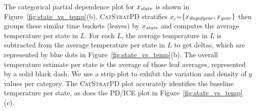 \documentclass[12pt]{article}
\newcommand{\figref}[1]{Figure~\ref{#1}}
\newcommand{\cut}[1]{}
\newcommand{\cspd}{\fontfamily{cmr}\textsc{\small CatStratPD}}
\newcommand{\xnc}{$x_{\overline{c}}$}
\begin{document}
The categorical partial dependence plot for $x_{\it state}$ is shown in \figref{fig:state_vs_temp}(b).
\cspd{} stratifies \xnc{}=$\{x_{\it dayofyear}, x_{\it year}\}$ then groups these similar time buckets (leaves) by $x_{\it state}$ and computes the average temperature per state in $L$. For each $L$, the average temperature in $L$ is subtracted from the average temperature per state in $L$ to get deltas, which are represented by blue dots in \figref{fig:state_vs_temp}(b). The overall temperature estimate per state is the average of those leaf averages, represented by a solid black dash. We use a strip plot to exhibit the variation and density of $y$ values per category. The \cspd{} plot accurately identifies the baseline temperature per state, as does the PD/ICE plot in \figref{fig:state_vs_temp}(c).

\cut{
For example, a partial dependence plot \figref{fig:state_vs_temp}(b) for the weather data shown in \figref{fig:state_vs_temp}(a) would show how, on average, the temperature of each state differs from the others on the same day (\xnc=$x_{dayofyear}$).

 $x_c = x_{state}$ versus $y$=temperature
 
For example, the partial dependence plot for $x_{state}$ versus temperature would show how much above or below the average US temperature each state is. 

For example, stratification for apartment rent data might group all one-bathroom apartments in a single building into a leaf. Within leaf $L$, two- and three-bedroom apartments would likely be above the average price in $L$ and zero- and one-bedroom apartments would likely be below the average. The overall categorical partial dependence plot we show the average category deltas across all leaves. 

Subtracting the average $y$ in leaf $L$ removes the contribution of \xnc{} to $y$.
} 
\end{document}
